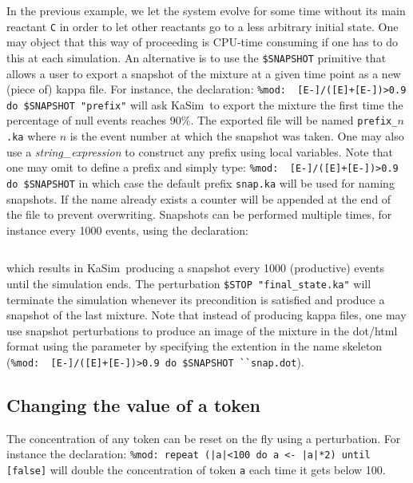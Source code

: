 \documentclass[11pt]{book}
\def\KaSim{\textsf{KaSim}}
\def\ttt#1{\texttt{#1}}
\begin{document}
In the previous example, we let the system evolve for some time without its main reactant \ttt{C} in order to let other reactants go to a less arbitrary initial state. One may object that this way of proceeding is CPU-time consuming if one has to do this at each simulation. An alternative is to use the \ttt{\$SNAPSHOT} primitive that allows a user to export a snapshot of the mixture at a given time point as a new (piece of) kappa file.
For instance, the declaration:
\lstinline[language=kappa]*%mod:  [E-]/([E]+[E-])>0.9 do $SNAPSHOT "prefix"*
will ask \KaSim~to export the mixture the first time the percentage of null events reaches 90\%. The exported file will be named \ttt{prefix\_$n$.ka} where $n$ is the event number at which the snapshot was taken. One may also use a \textit{string\_expression} to construct any prefix using local variables. Note that one may omit to define a prefix and simply type:
\lstinline[language=kappa]!%mod:  [E-]/([E]+[E-])>0.9 do $SNAPSHOT!
in which case the default prefix \ttt{snap.ka} will be used for naming snapshots.
If the name already exists a counter will be appended at the end of the file to prevent overwriting. Snapshots can be performed multiple times, for instance every 1000 events, using the declaration:
\begin{lstlisting}[language=kappa]
%mod: repeat ([E] [mod] 1000)=0 do $SNAPSHOT "abc.ka" until [false]
\end{lstlisting}
which results in \KaSim~producing a snapshot every 1000 (productive) events until the simulation ends. The perturbation \ttt{\$STOP "final\_state.ka"} will terminate the simulation whenever its precondition is satisfied and produce a snapshot of the last mixture. Note that instead of producing kappa files, one may use snapshot perturbations to produce an image of the mixture in the dot/html format using the parameter by specifying the extention in the name skeleton (\lstinline[language=kappa]!%mod:  [E-]/([E]+[E-])>0.9 do $SNAPSHOT ``snap.dot!).

\subsection{Changing the value of a token}
The concentration of any token can be reset on the fly using a perturbation. For instance the declaration:
\lstinline[language=kappa]!%mod: repeat (|a|<100 do a <- |a|*2) until [false]!
will double the concentration of token \ttt{a} each time it gets below 100.
\end{document}

